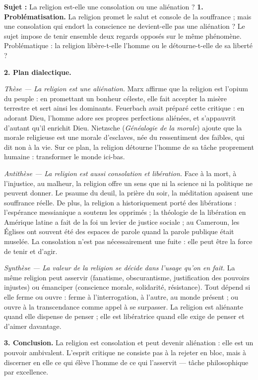 \documentclass[11pt]{article}
\newcommand{\cle}[1]{{\popxbold\color{popdark}#1}}
\begin{document}
\begin{exoresolu}
\textbf{Sujet :} La religion est-elle une consolation ou une aliénation ?
\tcblower
\textbf{1. Problématisation.} La religion promet le salut et console de la souffrance ; mais une consolation qui endort la conscience ne devient-elle pas une aliénation ? Le sujet impose de tenir ensemble deux regards opposés sur le même phénomène. Problématique : la religion libère-t-elle l'homme ou le détourne-t-elle de sa liberté ?

\textbf{2. Plan dialectique.}

\emph{Thèse — La religion est une aliénation.} Marx affirme que la religion est \guillemotleft l'opium du peuple \guillemotright : en promettant un bonheur céleste, elle fait accepter la misère terrestre et sert ainsi les dominants. Feuerbach avait préparé cette critique : en adorant Dieu, l'homme adore ses propres perfections aliénées, et s'appauvrit d'autant qu'il enrichit Dieu. Nietzsche (\emph{Généalogie de la morale}) ajoute que la morale religieuse est une morale d'esclaves, née du ressentiment des faibles, qui dit non à la vie. Sur ce plan, la religion détourne l'homme de sa tâche proprement humaine : transformer le monde ici-bas.

\emph{Antithèse — La religion est aussi consolation et libération.} Face à la mort, à l'injustice, au malheur, la religion offre un sens que ni la science ni la politique ne peuvent donner. Le psaume du deuil, la prière du soir, la \cle{méditation} apaisent une souffrance réelle. De plus, la religion a historiquement porté des libérations : l'espérance messianique a soutenu les opprimés ; la théologie de la libération en Amérique latine a fait de la foi un levier de justice sociale ; au Cameroun, les Églises ont souvent été des espaces de parole quand la parole publique était muselée. La consolation n'est pas nécessairement une fuite : elle peut être la force de tenir et d'agir.

\emph{Synthèse — La valeur de la religion se décide dans l'usage qu'on en fait.} La même religion peut asservir (fanatisme, obscurantisme, justification des pouvoirs injustes) ou émanciper (conscience morale, solidarité, résistance). Tout dépend si elle ferme ou ouvre : ferme à l'interrogation, à l'autre, au monde présent ; ou ouvre à la transcendance comme appel à se surpasser. La religion est aliénante quand elle dispense de penser ; elle est libératrice quand elle exige de penser et d'aimer davantage.

\textbf{3. Conclusion.} La religion est consolation et peut devenir aliénation : elle est un pouvoir ambivalent. L'esprit critique ne consiste pas à la rejeter en bloc, mais à discerner en elle ce qui élève l'homme de ce qui l'asservit — tâche philosophique par excellence.
\end{exoresolu}
\end{document}
